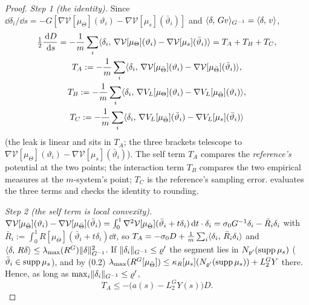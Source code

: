 \begin{proof}
\smallskip
\emph{Step 1 (the identity).} Since $\dd\delta_i/\dd s = -G[\nabla\mathcal{V}[\mu_\Theta](\vartheta_i)
- \nabla\mathcal{V}[\mu_s](\bar\vartheta_i)]$ and $\langle \delta,\, Gv\rangle_{G^{-1}} = \langle \delta,\, v\rangle$,
\begin{gather*}
  \tfrac12\frac{\,\mathrm{d} D}{\,\mathrm{d} s} = -\frac1m\sum_i\langle \delta_i,\, \nabla\mathcal{V}[\mu_\Theta](\vartheta_i) - \nabla\mathcal{V}[\mu_s](\bar\vartheta_i)\rangle
  = T_A + T_B + T_C,\\
  T_A := -\frac1m\sum_i\langle \delta_i,\, \nabla\mathcal{V}[\mu_{\bar\Theta}](\vartheta_i) - \nabla\mathcal{V}[\mu_{\bar\Theta}](\bar\vartheta_i)\rangle,\\
  T_B := -\frac1m\sum_i\langle \delta_i,\, \nabla V_L[\mu_\Theta](\vartheta_i) - \nabla V_L[\mu_{\bar\Theta}](\vartheta_i)\rangle,\\
  T_C := -\frac1m\sum_i\langle \delta_i,\, \nabla V_L[\mu_{\bar\Theta}](\bar\vartheta_i) - \nabla V_L[\mu_s](\bar\vartheta_i)\rangle
\end{gather*}
(the leak is linear and sits in $T_A$; the three brackets telescope to
$\nabla\mathcal{V}[\mu_\Theta](\vartheta_i) - \nabla\mathcal{V}[\mu_s](\bar\vartheta_i)$). The self term $T_A$
compares the \emph{reference's} potential at the two points; the interaction term $T_B$ compares the two empirical
measures at the $m$-system's point; $T_C$ is the reference's sampling error.
 evaluates the three terms and checks the identity to rounding.

\smallskip
\emph{Step 2 (the self term is local convexity).}
$\nabla\mathcal{V}[\mu_{\bar\Theta}](\vartheta_i) - \nabla\mathcal{V}[\mu_{\bar\Theta}](\bar\vartheta_i)
= \int_0^1\nabla^2\mathcal{V}[\mu_{\bar\Theta}](\bar\vartheta_i + t\delta_i)\,\mathrm{d} t\cdot\delta_i
= \sigma_0G^{-1}\delta_i - \bar R_i\delta_i$ with $\bar R_i := \int_0^1R[\mu_{\bar\Theta}](\bar\vartheta_i + t\delta_i)\dd t$,
so $T_A = -\sigma_0D + \frac1m\sum_i\langle \delta_i,\, \bar R_i\delta_i\rangle$ and
$\langle \delta,\, R\delta\rangle\le\lambda_{\max}(R^G)\lVert \delta\rVert^2_{G^{-1}}$. If $\lVert \delta_i\rVert_{G^{-1}}\le\varrho'$ the
segment lies in $N_{\varrho'}(\operatorname{supp}\mu_s)$ ($\bar\vartheta_i\in\operatorname{supp}\mu_s$), and by (0.2)
$\lambda_{\max}(R^G[\mu_{\bar\Theta}])\le\kappa_R[\mu_s](N_{\varrho'}(\operatorname{supp}\mu_s)) + L_2^GY$ there. Hence, as long
as $\max_i\lVert \delta_i\rVert_{G^{-1}}\le\varrho'$,
\begin{equation}
  T_A\le-\bigl(a(s) - L_2^GY(s)\bigr)D.
  \tag{2.1}
\end{equation}


\end{proof}
